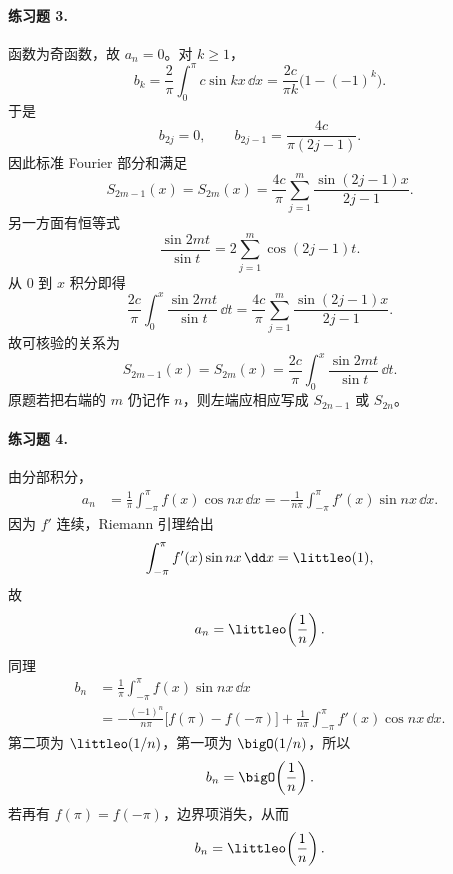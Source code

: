 \paragraph{练习题 3.}
\begin{xsolution}
函数为奇函数，故 $a_n=0$。对 $k\ge1$，
\[
  b_k=\frac2\pi\int_0^\pi c\sin kx\,\dd x
  =\frac{2c}{\pi k}\bigl(1-(-1)^k\bigr).
\]
于是
\[
  b_{2j}=0,\qquad b_{2j-1}=\frac{4c}{\pi(2j-1)}.
\]
因此标准 Fourier 部分和满足
\[
  S_{2m-1}(x)=S_{2m}(x)
  =\frac{4c}{\pi}\sum_{j=1}^{m}\frac{\sin(2j-1)x}{2j-1}.
\]
另一方面有恒等式
\[
  \frac{\sin2mt}{\sin t}=2\sum_{j=1}^{m}\cos(2j-1)t.
\]
从 $0$ 到 $x$ 积分即得
\[
  \frac{2c}{\pi}\int_0^x\frac{\sin2mt}{\sin t}\,\dd t
  =\frac{4c}{\pi}\sum_{j=1}^{m}\frac{\sin(2j-1)x}{2j-1}.
\]
故可核验的关系为
\[
  \boxed{\displaystyle
  S_{2m-1}(x)=S_{2m}(x)
  =\frac{2c}{\pi}\int_0^x\frac{\sin2mt}{\sin t}\,\dd t }.
\]
原题若把右端的 $m$ 仍记作 $n$，则左端应相应写成 $S_{2n-1}$ 或 $S_{2n}$。
\end{xsolution}

\paragraph{练习题 4.}
\begin{xsolution}
由分部积分，
\begin{align*}
  a_n
  &=\frac1\pi\int_{-\pi}^{\pi}f(x)\cos nx\,\dd x
   =-\frac1{n\pi}\int_{-\pi}^{\pi}f'(x)\sin nx\,\dd x.
\end{align*}
因为 $f'$ 连续，Riemann 引理给出
\[
  \int_{-\pi}^{\pi}f'(x)\sin nx\,\dd x=\littleo(1),
\]
故
\[
  a_n=\littleo\!\left(\frac1n\right).
\]
同理
\begin{align*}
  b_n
  &=\frac1\pi\int_{-\pi}^{\pi}f(x)\sin nx\,\dd x\\
  &=-\frac{(-1)^n}{n\pi}\bigl[f(\pi)-f(-\pi)\bigr]
    +\frac1{n\pi}\int_{-\pi}^{\pi}f'(x)\cos nx\,\dd x.
\end{align*}
第二项为 $\littleo(1/n)$，第一项为 $\bigO(1/n)$，所以
\[
  b_n=\bigO\!\left(\frac1n\right).
\]
若再有 $f(\pi)=f(-\pi)$，边界项消失，从而
\[
  b_n=\littleo\!\left(\frac1n\right).
\]
\end{xsolution}

